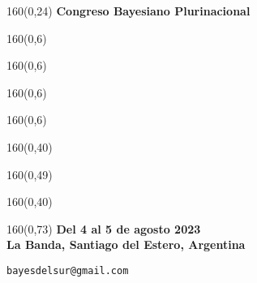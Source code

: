 \documentclass[shownotes,aspectratio=169]{beamer}
\begin{document}
\color{black!85}
\large

\begin{frame}

\begin{textblock}{160}(0,24) \centering
\LARGE \textcolor{black!85}{\fontsize{22}{0}\selectfont \textbf{Congreso Bayesiano Plurinacional}}
\end{textblock}
\begin{textblock}{160}(0,6) \centering
\LARGE  \textcolor{black!85}{}
\end{textblock}
\begin{textblock}{160}(0,6) \centering
\LARGE \textcolor{black!85}{\scalebox{4}{$p$}}
\end{textblock}
\begin{textblock}{160}(0,6) \centering
\LARGE \textcolor{black!85}{\scalebox{3.7}{C} \hspace{2.4cm} }
\end{textblock}
\begin{textblock}{160}(0,6) \centering
\LARGE \textcolor{black!85}{ \hspace{2.5cm} \scalebox{3.7}{P} }
\end{textblock}

\begin{textblock}{160}(0,40)\centering
\hspace{3.6cm} \LARGE  \textcolor{black!85}{}
\end{textblock}

\begin{textblock}{160}(0,49) \centering
\LARGE  \textcolor{black!85}{\scalebox{4}{$=$}}
\end{textblock}

\begin{textblock}{160}(0,40)\centering
\hspace{-3.8cm} \LARGE  \textcolor{black!85}{\scalebox{6}{$p$}}
\end{textblock}

\begin{textblock}{160}(0,73) \centering \Large \textcolor{black!75}{\textbf{
Del 4 al 5 de agosto 2023 \\
La Banda, Santiago del Estero, Argentina \\[0.1cm]}}

\normalsize \texttt{bayesdelsur@gmail.com}
\end{textblock}

\end{frame}
\end{document}

